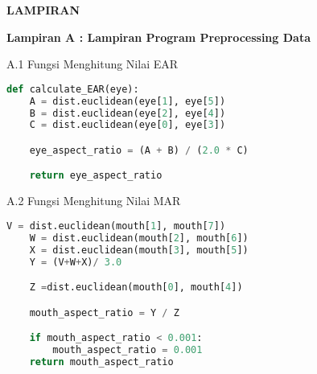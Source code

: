 \begin{center}
    \Large
    \textbf{LAMPIRAN}
\end{center}



\vspace{2ex}

\textbf{Lampiran A : Lampiran Program Preprocessing Data}

A.1 Fungsi Menghitung Nilai EAR
\begin{lstlisting}[language=Python]
    def calculate_EAR(eye):
    A = dist.euclidean(eye[1], eye[5])
    B = dist.euclidean(eye[2], eye[4])
    C = dist.euclidean(eye[0], eye[3])

    eye_aspect_ratio = (A + B) / (2.0 * C)

    return eye_aspect_ratio
\end{lstlisting}

A.2 Fungsi Menghitung Nilai MAR
\begin{lstlisting}[language=Python]
    V = dist.euclidean(mouth[1], mouth[7])
    W = dist.euclidean(mouth[2], mouth[6])
    X = dist.euclidean(mouth[3], mouth[5])
    Y = (V+W+X)/ 3.0

    Z =dist.euclidean(mouth[0], mouth[4])

    mouth_aspect_ratio = Y / Z

    if mouth_aspect_ratio < 0.001:
        mouth_aspect_ratio = 0.001
    return mouth_aspect_ratio
\end{lstlisting}

